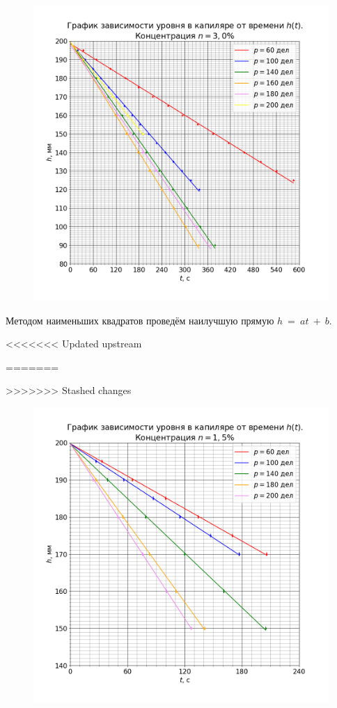 
\begin{figure}[H]
	\centering
	\includegraphics[width=1 \textwidth]{../plots/graph_h_t_0.png}
\end{figure}

Методом наименьших квадратов проведём наилучшую прямую $h~=~at~+~b$.

<<<<<<< Updated upstream

=======

>>>>>>> Stashed changes

\begin{figure}[H]
	\centering
	\includegraphics[width=1 \textwidth]{../plots/graph_h_t_1.png}
\end{figure}

